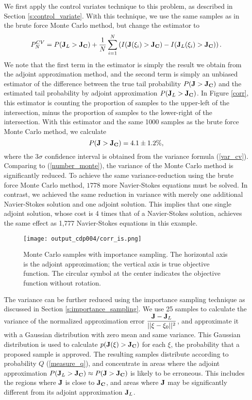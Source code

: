 We first apply the control variates technique to this problem, as described
in Section \ref{s:control_variate}.  With this
technique, we use the same samples as in the brute force Monte Carlo method, but
change the estimator to
\[ P^{CV}_N 
 = P({\bf J}_L > {\bf J_C}) + \frac{1}{N}
   \sum_{i=1}^N \left(
   I({\bf J}(\xi_i) > {\bf J_C}) - I({\bf J}_L(\xi_i) > {\bf J_C})\right) .\]
We note that the first term in the estimator is simply the result we obtain
from the adjoint approximation method, and the second term is simply an
unbiased estimator of the difference between the true tail probability
$P({\bf J} > {\bf J_C})$ and the estimated tail probability by adjoint
approximation $P({\bf J}_L > {\bf J_C})$.  In Figure \ref{corr}, this
estimator is counting the proportion of samples to the upper-left
of the intersection, minus the proportion of samples to the lower-right of
the intersection.  With this estimator and the same 1000 samples as the brute
force Monte Carlo method, we calculate
\begin{equation} \label{result_control_var}
P({\bf J} > {\bf J_C}) = 4.1 \pm 1.2 \% ,
\end{equation}
where the $3\sigma$ confidence interval is obtained from the variance formula
(\ref{var_cv}).  Comparing to (\ref{number_monte}), the variance of the Monte
Carlo method is significantly reduced.  To achieve the same variance-reduction
using the brute force Monte Carlo method, $1778$ more Navier-Stokes equations
must be solved.
In contrast, we achieved the same reduction in variance with merely
one additional Navier-Stokes solution and one adjoint solution.
This implies that one single adjoint solution, whose cost is 4 times that of
a Navier-Stokes solution, achieves the same effect as 1,777 Navier-Stokes
equations in this example.

\begin{figure}[htb!] \center
\texttt{[image: output\_cdp004/corr\_is.png]}
\caption{Monte Carlo samples with importance sampling.
         The horizontal axis is the adjoint approximation;
         the vertical axis is true objective function.
         The circular symbol at the center indicates the objective function
         without rotation. }
\label{is} 
\end{figure}
The variance can be further reduced using the importance sampling technique
as discussed in Section \ref{s:importance_sampling}.
We use 25 samples to calculate
the variance of the normalized approximation error
$\dfrac{{\bf J} - {\bf J}_L}{||\xi - \xi_0||^2}$, and approximate it with
a Gaussian distribution with zero mean and same variance.
This Gaussian distribution is used to calculate $p({\bf J}(\xi) > {\bf J_C})$
for each $\xi$, the probability that a proposed sample is approved.
The resulting samples distribute according to probability $Q$
(\ref{measure_q}), and concentrate in areas where the adjoint approximation
$P({\bf J}_L > {\bf J_C}) \approx P({\bf J} > {\bf J_C})$
is likely to be erroneous.  This includes
the regions where $\bf J$ is close to ${\bf J_C}$, and areas where
$\bf J$ may be significantly different from its adjoint approximation
${\bf J}_L$.

